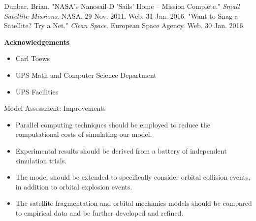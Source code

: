 \documentclass{beamer}
\begin{document}
\begin{frame}[allowframebreaks]
\begin{thebibliography}{10}
{
Dunbar, Brian. "NASA's Nanosail-D 'Sails' Home -- Mission Complete." \textit{Small Satellite Missions}. NASA, 29 Nov. 2011. Web. 31 Jan. 2016.
"Want to Snag a Satellite? Try a Net." \textit{Clean Space}. European Space Agency. Web. 30 Jan. 2016.
}\\
\vspace{7mm}
\large{
\textbf{Acknowledgements}
\begin{itemize}
    \item Carl Toews
    \item UPS Math and Computer Science Department
    \item UPS Facilities
\end{itemize}
}
\end{thebibliography}
\endgroup


    
\end{frame}


\begin{frame}{Model Assessment: Improvements}
\begin{itemize}
        \item Parallel computing techniques should be employed to reduce the computational costs of simulating our model.
        \item Experimental results should be derived from a battery of independent simulation trials.
        \item The model should be extended to specifically consider orbital collision events, in addition to orbital explosion events.
        \item The satellite fragmentation and orbital mechanics models should be compared to empirical data and be further developed and refined.
    \end{itemize}
\end{frame}
\end{document}
